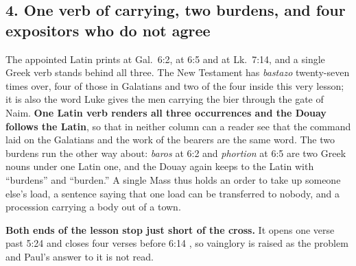 \subsection*{4. One verb of carrying, two burdens, and four expositors who do not agree}

The appointed Latin prints  at Gal.\ 6:2,  at
6:5 and  at Lk.\ 7:14, and a single Greek verb stands
behind all three. The New Testament has \emph{bastazo} twenty-seven times
over, four of those in Galatians and two of the four inside this very lesson;
it is also the word Luke gives the men carrying the bier through the gate of
Naim. \textbf{One Latin verb renders all three occurrences and the Douay
follows the Latin}, so that in neither column can a reader see that the
command laid on the Galatians and the work of the bearers are the same word.
The two burdens run the other way about: \emph{baros} at 6:2 and
\emph{phortion} at 6:5 are two Greek nouns under one Latin one, and the Douay
again keeps to the Latin with ``burdens'' and ``burden.'' A single Mass thus
holds an order to take up someone else's load, a sentence saying that one load
can be transferred to nobody, and a procession carrying a body out of a town.

\textbf{Both ends of the lesson stop just short of the cross.} It opens one
verse past 5:24  and
closes four verses before 6:14 , so vainglory is raised as the problem and Paul's
answer to it is not read.

